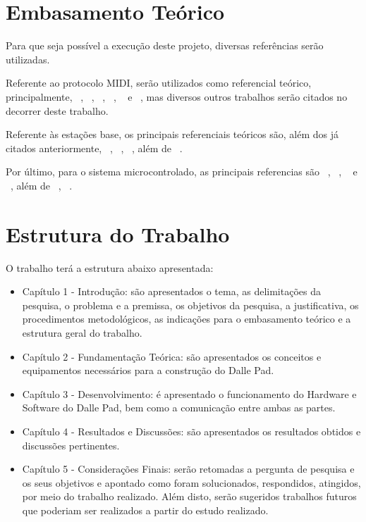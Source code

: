 
    \section{Embasamento Teórico}

        Para que seja possível a execução deste projeto, diversas referências serão utilizadas.

        Referente ao protocolo MIDI, serão utilizados como referencial teórico, principalmente, ~\cite{Alves}, ~\cite{Hewitt}, ~\cite{Colbeck}, ~\cite{Guerin}, ~\cite{McGuire} e ~\cite{Huber}, mas diversos outros trabalhos serão citados no decorrer deste trabalho.

        Referente às estações base, os principais referenciais teóricos são, além dos já citados anteriormente, ~\cite{Ballou}, ~\cite{Gregoire}, ~\cite{Jackson}, além de ~\cite{AndroidDeveloper}.

        Por último, para o sistema microcontrolado, as principais referencias são ~\cite{Wheat}, ~\cite{Bayle}, ~\cite{Ghassaei} e ~\cite{Hass}, além de ~\cite{Arduino2014}, ~\cite{ArduinoRef2014}.

    \section{Estrutura do Trabalho}

        O trabalho terá a estrutura abaixo apresentada:

        \begin{itemize}
          \item Capítulo 1 - Introdução: são apresentados o tema, as delimitações da pesquisa, o problema e a premissa, os objetivos da pesquisa, a justificativa, os procedimentos metodológicos, as indicações para o embasamento teórico e a estrutura geral do trabalho.

          \item Capítulo 2 - Fundamentação Teórica: são apresentados os conceitos e equipamentos necessários para a construção do Dalle Pad.

          \item Capítulo 3 - Desenvolvimento: é apresentado o funcionamento do Hardware e Software do Dalle Pad, bem como a comunicação entre ambas as partes.

          \item Capítulo 4 - Resultados e Discussões: são apresentados os resultados obtidos e discussões pertinentes.

          \item Capítulo 5 - Considerações Finais: serão retomadas a pergunta de pesquisa e os seus objetivos e apontado como foram solucionados, respondidos, atingidos, por meio do trabalho realizado. Além disto, serão sugeridos trabalhos futuros que poderiam ser realizados a partir do estudo realizado.
        \end{itemize}

